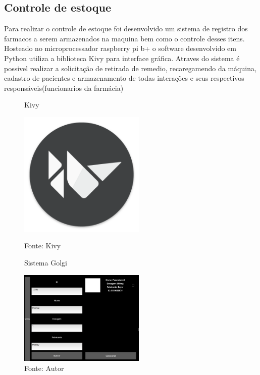 \documentclass[../poliXuniversity_hospital_(USP)_report.tex]{subfiles}
\begin{document}
\subsection{Controle de estoque}
Para realizar o controle de estoque foi desenvolvido um sistema de registro dos farmacos a serem armazenados na maquina bem como o controle desses itens. Hosteado no microprocessador raspberry pi b+ o software desenvolvido em Python utiliza a biblioteca Kivy para interface gráfica. Atraves do sistema é possivel realizar a solicitação de retirada de remedio, recaregamendo da máquina, cadastro de pacientes e armazenamento de todas interações e seus respectivos responsáveis(funcionarios da farmácia)
\begin{figure}[h]
\centering
    \begin{minipage}{0.5\textwidth}
        \centering
        \caption{Kivy}
        \centering %
        \includegraphics[width=6cm]{images/Kivy_logo.png}
        \caption*{Fonte: Kivy}
        \label{figura: Kivy}
        
    \end{minipage}\hfill
    \begin{minipage}{0.5\textwidth}
    
        \centering
        \caption{Sistema Golgi}
        \centering %
        \includegraphics[width=6cm]{images/sistema_golgi.png}
        \caption*{Fonte: Autor}
        \label{figura: Sistema Golgi}
        
    \end{minipage}\hfill
\end{figure}
\end{document}
